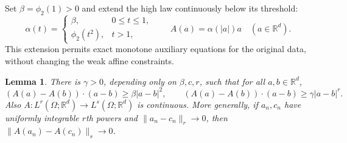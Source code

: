 \documentclass[11pt]{article}
\newtheorem{lemma}[lemma]{Lemma}
\theoremstyle{remark}
\newcommand{\R}{\mathbb R}
\newcommand{\norm}[2]{\lVert #1\rVert_{#2}}
\begin{document}
Set $\beta=\phi_2(1)>0$ and extend the high law continuously below its
threshold:
\begin{equation}\label{eq:A}
 \alpha(t)=\begin{cases}\beta,&0\le t\le1,\\\phi_2(t^2),&t>1,\end{cases}
 \qquad A(a)=\alpha(|a|)a\quad(a\in\R^d).
\end{equation}
This extension permits exact monotone auxiliary equations for the original
data, without changing the weak affine constraints.

\clearpage
\begin{lemma}\label{lem:monotonicity}
There is $\gamma>0$, depending only on $\beta,c,r$, such that
for all $a,b\in\R^d$,
\begin{equation}\label{eq:monotonicity}
 (A(a)-A(b))\cdot(a-b)\ge\beta|a-b|^2,
 \qquad (A(a)-A(b))\cdot(a-b)\ge\gamma|a-b|^r.
\end{equation}
Also $A:L^r(\Omega;\R^d)\to L^s(\Omega;\R^d)$ is continuous.
More generally, if $a_n,c_n$ have uniformly integrable $r$th powers and
$\norm{a_n-c_n}{r}\to0$, then $\norm{A(a_n)-A(c_n)}{s}\to0$.
\end{lemma}
\end{document}
